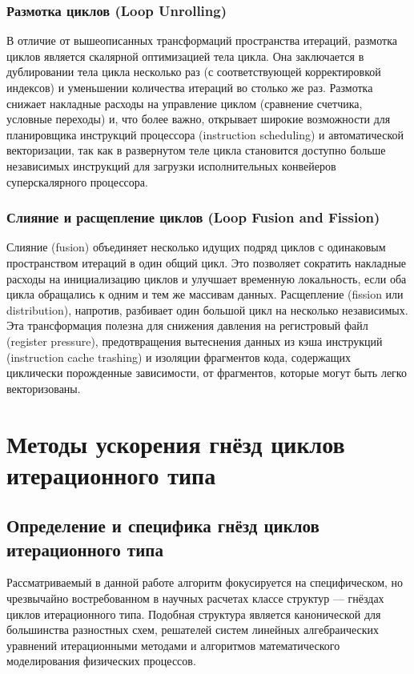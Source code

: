 \documentclass[14pt, russian]{scrartcl}
\begin{document}
\subsubsection{Размотка циклов (Loop Unrolling)}
В отличие от вышеописанных трансформаций пространства итераций, размотка циклов является скалярной оптимизацией тела цикла. Она заключается в дублировании тела цикла несколько раз (с соответствующей корректировкой индексов) и уменьшении количества итераций во столько же раз. Размотка снижает накладные расходы на управление циклом (сравнение счетчика, условные переходы) и, что более важно, открывает широкие возможности для планировщика инструкций процессора (instruction scheduling) и автоматической векторизации, так как в развернутом теле цикла становится доступно больше независимых инструкций для загрузки исполнительных конвейеров суперскалярного процессора.

\subsubsection{Слияние и расщепление циклов (Loop Fusion and Fission)}
Слияние (fusion) объединяет несколько идущих подряд циклов с одинаковым пространством итераций в один общий цикл. Это позволяет сократить накладные расходы на инициализацию циклов и улучшает временную локальность, если оба цикла обращались к одним и тем же массивам данных. 
Расщепление (fission или distribution), напротив, разбивает один большой цикл на несколько независимых. Эта трансформация полезна для снижения давления на регистровый файл (register pressure), предотвращения вытеснения данных из кэша инструкций (instruction cache trashing) и изоляции фрагментов кода, содержащих циклически порожденные зависимости, от фрагментов, которые могут быть легко векторизованы.

\section{Методы ускорения гнёзд циклов итерационного типа}

\subsection{Определение и специфика гнёзд циклов итерационного типа}

Рассматриваемый в данной работе алгоритм фокусируется на специфическом, но чрезвычайно востребованном в научных расчетах классе структур --- гнёздах циклов итерационного типа. Подобная структура является канонической для большинства разностных схем, решателей систем линейных алгебраических уравнений итерационными методами и алгоритмов математического моделирования физических процессов.
\end{document}
